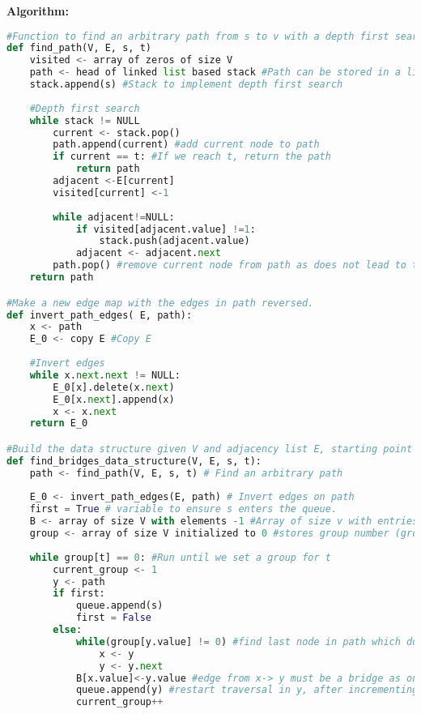 \documentclass[10pt, a4paper]{article}
\begin{document}
\textbf{Algorithm:}
\begin{lstlisting}[language=Python,caption= 1-connectivity]
#Function to find an arbitrary path from s to v with a depth first search
def find_path(V, E, s, t)
    visited <- array of zeros of size V 
    path <- head of linked list based stack #Path can be stored in a linked stack.
    stack.append(s) #Stack to implement depth first search
    
    #Depth first search
    while stack != NULL
        current <- stack.pop()
        path.append(current) #add current node to path
        if current == t: #If we reach t, return the path
            return path
        adjacent <-E[current]
        visited[current] <-1
        
        while adjacent!=NULL:
            if visited[adjacent.value] !=1:
                stack.push(adjacent.value)
            adjacent <- adjacent.next
        path.pop() #remove current node from path as does not lead to t.
    return path

#Make a new edge map with the edges in path reversed.
def invert_path_edges( E, path):
    x <- path
    E_0 <- copy E #Copy E
    
    #Invert edges
    while x.next.next != NULL:
        E_0[x].delete(x.next)
        E_0[x.next].append(x)
        x <- x.next
    return E_0

#Build the data structure given V and adjacency list E, starting point s, and ending point t.
def find_bridges_data_structure(V, E, s, t):
    path <- find_path(V, E, s, t) # Find an arbitrary path
    
    E_0 <- invert_path_edges(E, path) # Invert edges on path
    first = True # variable to ensure s enters the queue.
    B <- array of size V with elements -1 #Array of size v with entries -1
    group <- array of size V initialized to 0 #stores group number (groups separated by bridges)
    
    while group[t] == 0: #Run until we set a group for t
        current_group <- 1
        y <- path
        if first:
            queue.append(s)
            first = False
        else:
            while(group[y.value] != 0) #find last node in path which does not have a group
                x <- y
                y <- y.next
            B[x.value]<-y.value #edge from x-> y must be a bridge as one cannot reach t from s without traversing it
            queue.append(y) #restart traversal in y, after incrementing current group
            current_group++
        

\end{lstlisting}
\end{document}
